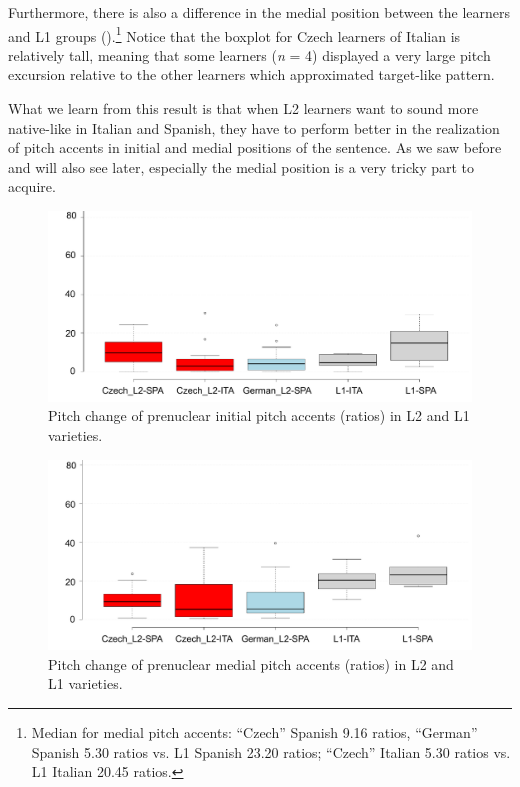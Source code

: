 Furthermore, there is also a difference in the medial position between the learners and L1 groups ().{\footnote{Median for medial pitch accents: “Czech” Spanish 9.16 ratios, “German” Spanish 5.30 ratios vs. L1 Spanish 23.20 ratios; “Czech” Italian 5.30 ratios vs. L1 Italian 20.45 ratios.}} Notice that the boxplot for Czech learners of Italian is relatively tall, meaning that some learners (\textit{n} = 4) displayed a very large pitch excursion relative to the other learners which approximated target-like pattern.\largerpage[2.25]

What we learn from this result is that when L2 learners want to sound more native-like in Italian and Spanish, they have to perform better in the realization of pitch accents in initial and medial positions of the sentence. As we saw before and will also see later, especially the medial position is a very tricky part to acquire.\pagebreak


\begin{figure}
\includegraphics[width=\textwidth]{figures/Figure_50.pdf}
\caption{Pitch change of prenuclear initial pitch accents (ratios) in L2 and L1 varieties.}
\label{fig:4.50}
\end{figure}

\begin{figure}
\includegraphics[width=\textwidth]{figures/Figure_51.pdf}
\caption{Pitch change of prenuclear medial pitch accents (ratios) in L2 and L1 varieties.}
\label{fig:4.51}
\end{figure}

